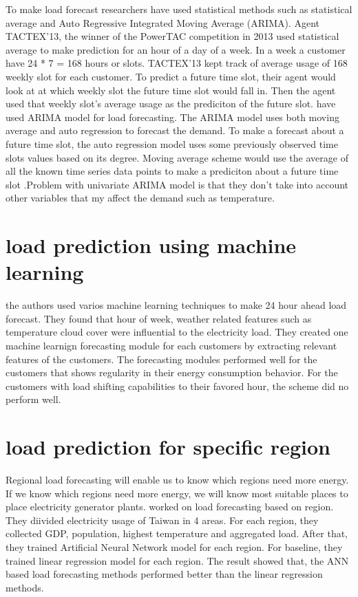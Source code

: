 To make load forecast researchers have used statistical methods such as statistical average and Auto Regressive Integrated Moving Average (ARIMA).  Agent TACTEX'13, the winner of the PowerTAC competition in 2013 used statistical average to make prediction for an hour of a day of a week. In a week a customer have 24 * 7 = 168 hours or slots. TACTEX'13  kept track of average usage of 168 weekly slot for each customer. To predict a future time slot, their agent would look at at which weekly slot the future time slot would fall in. Then the agent used that weekly slot's average usage as the prediciton of the future slot. \cite{cho1995customer} have used ARIMA model for load forecasting. The ARIMA model uses both moving average and auto regression to forecast the demand. To make a forecast about a future time slot, the auto regression model uses some previously observed time slots values based on its degree. Moving average scheme would use the average of all the known time series data points to make a prediciton about a future time slot .Problem with univariate ARIMA model is that they don't take into account other variables that my affect the demand such as temperature.   


\section{load prediction using machine learning}
\cite{parra2013initial} the authors used varios machine learning techniques to make 24 hour ahead load forecast. They found that hour of week, weather related features such as temperature cloud cover were influential to the electricity load. They created one machine learnign forecasting module for each customers by extracting relevant features of the customers. The forecasting modules performed well for the customers that shows regularity in their energy consumption behavior. For the customers with load shifting capabilities to their favored hour, the scheme did no perform well.

\section{load prediction for specific region}
Regional load forecasting will enable us to know which regions need more energy. If we know which regions need more energy, we will know most suitable places to place electricity generator plants. \cite{hsu2003regional} worked on load forecasting based on region. They diivided electricity usage of Taiwan in 4 areas. For each region, they collected GDP,  population, highest temperature and aggregated load. After that, they trained Artificial Neural Network model for each region. For baseline, they trained linear regression model for each region. The result showed that, the ANN based load forecasting methods performed better than the linear regression  methods. 


